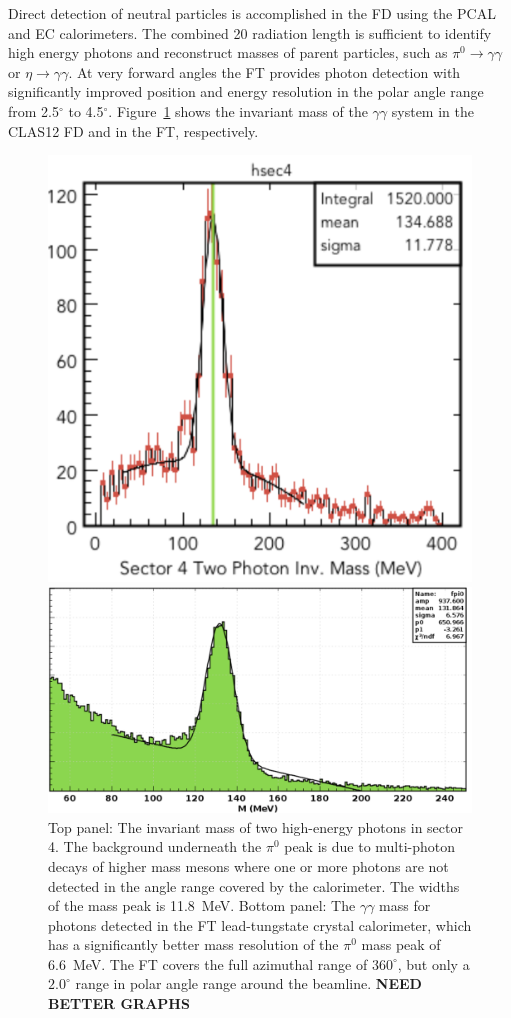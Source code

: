\documentclass[final,3p,twocolumn]{elsarticle}
\begin{document}
Direct detection of neutral particles is accomplished in the FD using the PCAL and EC calorimeters. The combined
20 radiation length is sufficient to identify high energy photons and reconstruct masses of parent particles, such
as $\pi^0\to \gamma \gamma$  or $\eta \to \gamma \gamma$. At very forward angles the FT provides photon
detection with significantly improved position and energy resolution in the polar angle range from 2.5$^\circ$ to
4.5$^\circ$. Figure~\ref{gg} shows the invariant mass of the $\gamma\gamma$ system in the CLAS12 FD and in
the FT, respectively. 

\begin{figure}[htbp!]
\centerline{\includegraphics[width=0.95\columnwidth]{pi0.png}}
\centerline{\includegraphics[width=0.9\columnwidth]{ft-pi0.png}}
\caption{Top panel: The invariant mass of two high-energy photons in sector 4. The background underneath the 
$\pi^0$ peak is due to multi-photon decays of higher mass mesons where one or more photons are not detected
in the angle range covered by the calorimeter. The widths of the mass peak is 11.8~MeV. Bottom panel: The
$\gamma\gamma$ mass for photons detected in the FT lead-tungstate crystal calorimeter, which has a significantly
better mass resolution of the $\pi^0$ mass peak of 6.6~MeV. The FT covers the full azimuthal range of $360^\circ$, 
but only a $2.0^\circ$ range in polar angle range around the beamline. {\bf NEED BETTER GRAPHS}} 
\label{gg}
\end{figure}
\end{document}
